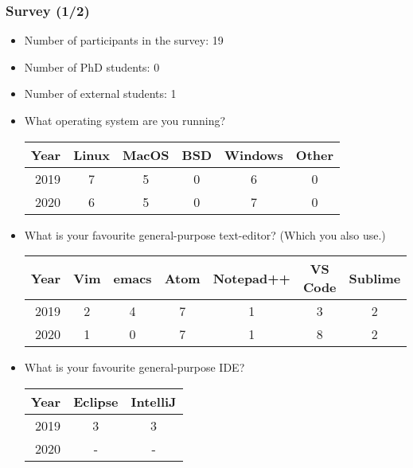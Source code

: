 \def\arraystretch{1.2}

\begin{frame}

\frametitle{Survey (1/2)}

\begin{itemize}

\footnotesize

\item Number of participants in the survey: 19

\item Number of PhD students: 0

\item Number of external students: 1

\item What operating system are you running?

\begin{tabular}{|r|c|c|c|c|c|}
\hline
\textbf{Year} & \textbf{Linux} & \textbf{MacOS} & \textbf{BSD} &%
\textbf{Windows} & \textbf{Other}
\\\hline
2019 & 7 & 5 & 0 & 6 & 0 \\\hline
2020 & 6 & 5 & 0 & 7 & 0 \\\hline
\end{tabular}

\item What is your favourite general-purpose text-editor? (Which you also use.)

\begin{tabular}{|r|c|c|c|c|c|c|}
\hline
\textbf{Year} & \textbf{Vim} & \textbf{emacs} & \textbf{Atom} &%
\textbf{Notepad++} & \textbf{VS Code} & \textbf{Sublime}
\\\hline
2019 & 2 & 4 & 7 & 1 & 3 & 2 \\\hline
2020 & 1 & 0 & 7 & 1 & 8 & 2 \\\hline
\end{tabular}

\item What is your favourite general-purpose IDE?

\begin{tabular}{|r|c|c|}
\hline
\textbf{Year} & \textbf{Eclipse} & \textbf{IntelliJ}
\\\hline
2019 & 3 & 3 \\\hline
2020 & - & - \\\hline
\end{tabular}

\end{itemize}

\end{frame}

